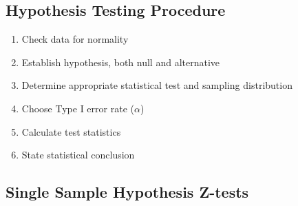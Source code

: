 \documentclass{article}
\begin{document}
\subsection{Hypothesis Testing Procedure}

\begin{enumerate}
    \item Check data for normality
    \item Establish hypothesis, both null and alternative
    \item Determine appropriate statistical test and sampling distribution
    \item Choose Type I error rate ($\alpha$)
    \item Calculate test statistics
    \item State statistical conclusion
\end{enumerate}

\subsection{Single Sample Hypothesis Z-tests}
\end{document}
